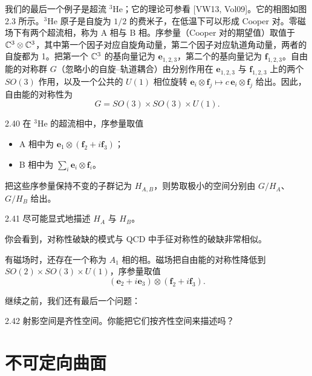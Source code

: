 我们的最后一个例子是超流 $^3$He；它的理论可参看 [VW13, Vol09]。它的相图如图 2.3 所示。$^3$He 原子是自旋为 $1/2$ 的费米子，在低温下可以形成 Cooper 对。零磁场下有两个超流相，称为 A 相与 B 相。序参量（Cooper 对的期望值）取值于 $\mathbb{C}^3\otimes\mathbb{C}^3$，其中第一个因子对应自旋角动量，第二个因子对应轨道角动量，两者的自旋都为 1。把第一个 $\mathbb{C}^3$ 的基向量记为 $\mathbf{e}_{1,2,3}$，第二个的基向量记为 $\mathbf{f}_{1,2,3}$。自由能的对称群 $G$（忽略小的自旋--轨道耦合）由分别作用在 $\mathbf{e}_{1,2,3}$ 与 $\mathbf{f}_{1,2,3}$ 上的两个 $SO(3)$ 作用，以及一个公共的 $U(1)$ 相位旋转 $\mathbf{e}_i\otimes\mathbf{f}_j\mapsto c\,\mathbf{e}_i\otimes\mathbf{f}_j$ 给出。因此，自由能的对称性为
\begin{equation}
G=SO(3)\times SO(3)\times U(1). \tag{2.44}
\end{equation}

\begin{example}{2.40}
在 $^3$He 的超流相中，序参量取值
\begin{itemize}
\item A 相中为 $\mathbf{e}_1\otimes(\mathbf{f}_2+i\mathbf{f}_3)$；
\item B 相中为 $\sum_i\mathbf{e}_i\otimes\mathbf{f}_i$。
\end{itemize}
把这些序参量保持不变的子群记为 $H_{A,B}$，则势取极小的空间分别由 $G/H_A$、$G/H_B$ 给出。
\end{example}

\begin{question}{2.41}
尽可能显式地描述 $H_A$ 与 $H_B$。
\end{question}

你会看到，对称性破缺的模式与 QCD 中手征对称性的破缺非常相似。

有磁场时，还存在一个称为 $A_1$ 相的相。磁场把自由能的对称性降低到 $SO(2)\times SO(3)\times U(1)$，序参量取值
\[
(\mathbf{e}_2+i\mathbf{e}_3)\otimes(\mathbf{f}_2+i\mathbf{f}_3).
\]

继续之前，我们还有最后一个问题：

\begin{question}{2.42}
射影空间是齐性空间。你能把它们按齐性空间来描述吗？
\end{question}


\section{不可定向曲面}

